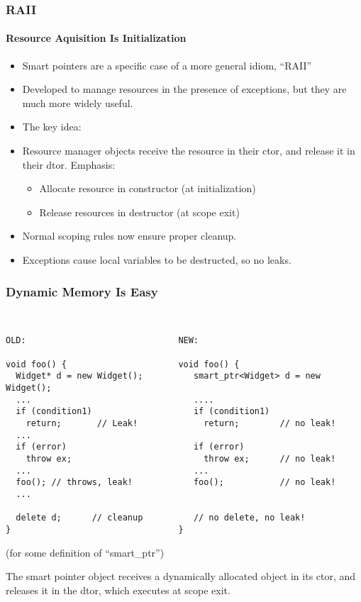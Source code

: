 \begin{frame}[fragile,t]
\frametitle{RAII}
\framesubtitle{Resource Aquisition Is Initialization}
\begin{itemize}
\item Smart pointers are a specific case of a more general idiom, ``RAII''
\item Developed to manage resources in the presence of exceptions, but
  they are much more widely useful.
\item The key idea:  
\item Resource manager objects receive the resource in their
  ctor, and release it in their dtor.  Emphasis:
\begin{itemize}
  \item Allocate resource in constructor (at initialization)
  \item Release resources in destructor (at scope exit)
\end{itemize}
\item Normal scoping rules now ensure proper cleanup.
\item Exceptions cause local variables to be destructed, so no leaks.
\end{itemize}
\vskip 12pt
\pause{}
\pause{}
\center{\Emph{\texttt{\}}}}

\end{frame}


\begin{frame}[fragile,t]
\frametitle{Dynamic Memory Is Easy}
{\scriptsize\
\begin{verbatim}
OLD:                              NEW:

void foo() {                      void foo() {
  Widget* d = new Widget();          smart_ptr<Widget> d = new Widget();
  ...                                ....
  if (condition1)                    if (condition1) 
    return;       // Leak!             return;        // no leak!
  ...
  if (error)                         if (error)
    throw ex;                          throw ex;      // no leak!
  ...                                ...
  foo(); // throws, leak!            foo();           // no leak!
  ...             

  delete d;      // cleanup          // no delete, no leak!
}                                 } 
\end{verbatim}
}

(for some definition of ``smart\_ptr'')

The smart pointer object receives a dynamically allocated object in
its ctor, and releases it in the dtor, which executes at scope exit.
\end{frame}


